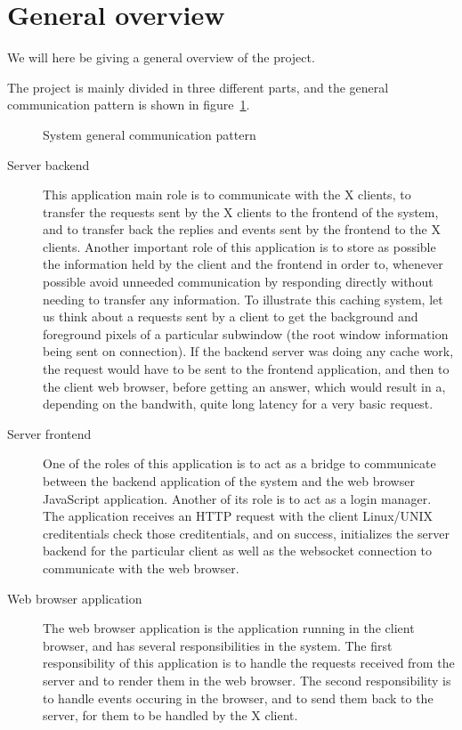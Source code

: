 \section{General overview}
We will here be giving a general overview of the project. 

The project is mainly divided in three different parts, and the general 
communication pattern is shown in figure~\ref{fig:project-overview}.
\begin{figure}[tb]
  \begin{center}
    
    \caption{\label{fig:project-overview}System general communication pattern}
  \end{center}
\end{figure}
\begin{description}
\item[Server backend]
  This application main role is to communicate with the X clients, 
  to transfer the requests sent by the X clients to the frontend of the system, 
  and to transfer back the replies and events sent by the frontend to the 
  X clients. 
%  
  Another important role of this application is to store as possible 
  the information held by the client and the frontend in order to, whenever 
  possible avoid unneeded communication by responding directly without 
  needing to transfer any information.
%
  To illustrate this caching system, let us think about a requests sent by a 
  client to get the background and foreground pixels of a particular 
  subwindow (the root window information being sent on connection). If the 
  backend server was doing any cache work, the request would have to be 
  sent to the frontend application, and then to the client web browser, before 
  getting an answer, which would result in a, depending on the bandwith, 
  quite long latency for a very basic request.   
  
\item[Server frontend]
  One of the roles of this application  is to act as a bridge to
  communicate between the backend application of the system 
  and the web browser JavaScript application.
%
  Another of its role is to act as a login manager. The application 
  receives an HTTP request with the client Linux/UNIX creditentials 
  check those creditentials, and on success, initializes the server 
  backend for the particular client as well as the websocket connection 
  to communicate with the web browser.
\item[Web browser application]
  The web browser application is the application running in the client 
  browser, and has several responsibilities in the system.
%
  The first responsibility of this application is to handle the 
  requests received from the server and to render them in the web 
  browser.
%
  The second responsibility is to handle events occuring in the browser, and to 
  send them back to the server, for them to be handled by the X client.
\end{description}



